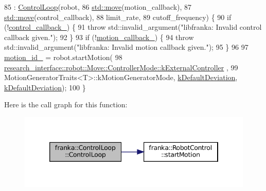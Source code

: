 \begin{DoxyCode}
85     : \hyperlink{classfranka_1_1ControlLoop_ac98d7227389027af16be738dbe7043c7}{ControlLoop}(robot,
86                   \hyperlink{namespacefranka__gripper_a1356a87108d2229401d3755bd3e53bdf}{std::move}(motion\_callback),
87                   \hyperlink{namespacefranka__gripper_a1356a87108d2229401d3755bd3e53bdf}{std::move}(control\_callback),
88                   limit\_rate,
89                   cutoff\_frequency) \{
90   \textcolor{keywordflow}{if} (!\hyperlink{classfranka_1_1ControlLoop_a71249c690ee56b2c099bbb4f29e92c95}{control\_callback\_}) \{
91     \textcolor{keywordflow}{throw} std::invalid\_argument(\textcolor{stringliteral}{"libfranka: Invalid control callback given."});
92   \}
93   \textcolor{keywordflow}{if} (!\hyperlink{classfranka_1_1ControlLoop_a8304d484624d562c70e3572d5037871b}{motion\_callback\_}) \{
94     \textcolor{keywordflow}{throw} std::invalid\_argument(\textcolor{stringliteral}{"libfranka: Invalid motion callback given."});
95   \}
96 
97   \hyperlink{classfranka_1_1ControlLoop_a4dd139afcabc3a50bb9eb35ca44845fa}{motion\_id\_} = robot.startMotion(
98       \hyperlink{structresearch__interface_1_1robot_1_1Move_a3e7b80b30bbf01dc902c84402502ebbcaae18ec698c6d2260b411166de51e86fe}{research\_interface::robot::Move::ControllerMode::kExternalController}
      ,
99       MotionGeneratorTraits<T>::kMotionGeneratorMode, \hyperlink{classfranka_1_1ControlLoop_a935eeb4a950ed2276e5c00d26e9c5a16}{kDefaultDeviation}, 
      \hyperlink{classfranka_1_1ControlLoop_a935eeb4a950ed2276e5c00d26e9c5a16}{kDefaultDeviation});
100 \}
\end{DoxyCode}
Here is the call graph for this function\+:
\nopagebreak
\begin{figure}[H]
\begin{center}
\leavevmode
\includegraphics[width=346pt]{classfranka_1_1ControlLoop_ac98d7227389027af16be738dbe7043c7_cgraph}
\end{center}
\end{figure}
\mbox{\label{classfranka_1_1ControlLoop_a1fda76bf0db7818859abf1d52f6c0c94}} 
